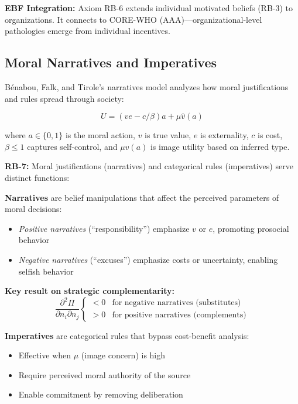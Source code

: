 \textbf{EBF Integration:} Axiom RB-6 extends individual motivated beliefs (RB-3) to organizations. It connects to CORE-WHO (AAA)---organizational-level pathologies emerge from individual incentives.

\subsection{Moral Narratives and Imperatives}
\label{subsec:rb-narratives}

Bénabou, Falk, and Tirole's narratives model \citep{benabou_2018_narratives} analyzes how moral justifications and rules spread through society:

\begin{equation}
U = (ve - c/\beta)a + \mu \hat{v}(a)
\label{eq:rb-narratives}
\end{equation}

where $a \in \{0,1\}$ is the moral action, $v$ is true value, $e$ is externality, $c$ is cost, $\beta \leq 1$ captures self-control, and $\mu \hat{v}(a)$ is image utility based on inferred type.

\begin{axiom}
\label{ax:rb-7}
\textbf{RB-7:} Moral justifications (narratives) and categorical rules (imperatives) serve distinct functions:

\textbf{Narratives} are belief manipulations that affect the perceived parameters of moral decisions:
\begin{itemize}
    \item \textit{Positive narratives} (``responsibility'') emphasize $v$ or $e$, promoting prosocial behavior
    \item \textit{Negative narratives} (``excuses'') emphasize costs or uncertainty, enabling selfish behavior
\end{itemize}

\textbf{Key result on strategic complementarity:}
\begin{equation}
\frac{\partial^2 \Pi}{\partial n_i \partial n_j} \begin{cases} < 0 & \text{for negative narratives (substitutes)} \\ > 0 & \text{for positive narratives (complements)} \end{cases}
\end{equation}

\textbf{Imperatives} are categorical rules that bypass cost-benefit analysis:
\begin{itemize}
    \item Effective when $\mu$ (image concern) is high
    \item Require perceived moral authority of the source
    \item Enable commitment by removing deliberation
\end{itemize}
\end{axiom}

